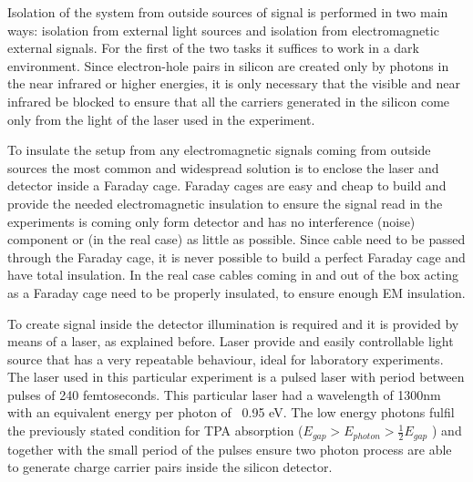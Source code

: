 Isolation of the system from outside sources of signal is performed in two main ways: isolation from external light sources and isolation from electromagnetic external signals. For the first of the two tasks it suffices to work in a dark environment. Since electron-hole pairs in silicon are created only by photons in the near infrared or higher energies, it is only necessary that the visible and near infrared be blocked to ensure that all the carriers generated in the silicon come only from the light of the laser used in the experiment.

To insulate the setup from any electromagnetic signals coming from outside sources the most common and widespread solution is to enclose the laser and detector inside a Faraday cage. Faraday cages are easy and cheap to build and provide the needed electromagnetic insulation to ensure the signal read in the experiments is coming only form detector and has no interference (noise) component or (in the real case) as little as possible. Since cable need to be passed through the Faraday cage, it is never possible to build a perfect Faraday cage and have total insulation. In the real case cables coming in and out of the box acting as a Faraday cage need to be properly insulated, to ensure enough EM insulation.

To create signal inside the detector illumination is required and it is provided by means of a laser, as explained before. Laser provide and easily controllable light source that has a very repeatable behaviour, ideal for laboratory experiments. The laser used in this particular experiment is a pulsed laser with period between pulses of 240 femtoseconds. This particular laser had a wavelength of 1300nm with an equivalent energy per photon of ~0.95 eV. The low energy photons fulfil the previously stated condition for TPA absorption ($E_{gap} > E_{photon} > \frac{1}{2} E_{gap}$ ) and together with the small period of the pulses ensure two photon process are able to generate charge carrier pairs inside the silicon detector.



